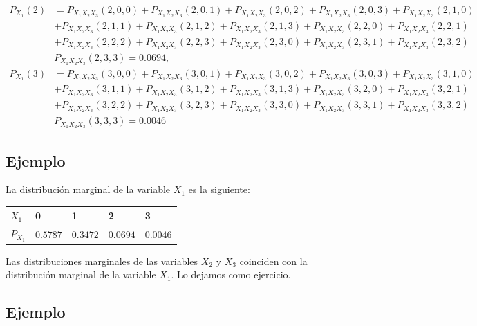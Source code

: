 \documentclass[]{book}
\begin{document}
\[
\begin{array}{rl}
P_{X_1}(2) & = P_{X_1X_2X_3}(2,0,0)+P_{X_1X_2X_3}(2,0,1)+P_{X_1X_2X_3}(2,0,2)+P_{X_1X_2X_3}(2,0,3)+P_{X_1X_2X_3}(2,1,0) \\ & +P_{X_1X_2X_3}(2,1,1)+P_{X_1X_2X_3}(2,1,2)+P_{X_1X_2X_3}(2,1,3)+P_{X_1X_2X_3}(2,2,0)+P_{X_1X_2X_3}(2,2,1)\\ &
+P_{X_1X_2X_3}(2,2,2)+P_{X_1X_2X_3}(2,2,3)+P_{X_1X_2X_3}(2,3,0)+P_{X_1X_2X_3}(2,3,1)+P_{X_1X_2X_3}(2,3,2)\\ &
P_{X_1X_2X_3}(2,3,3)=0.0694,\\
P_{X_1}(3) & = P_{X_1X_2X_3}(3,0,0)+P_{X_1X_2X_3}(3,0,1)+P_{X_1X_2X_3}(3,0,2)+P_{X_1X_2X_3}(3,0,3)+P_{X_1X_2X_3}(3,1,0) \\ & +P_{X_1X_2X_3}(3,1,1)+P_{X_1X_2X_3}(3,1,2)+P_{X_1X_2X_3}(3,1,3)+P_{X_1X_2X_3}(3,2,0)+P_{X_1X_2X_3}(3,2,1)\\ &
+P_{X_1X_2X_3}(3,2,2)+P_{X_1X_2X_3}(3,2,3)+P_{X_1X_2X_3}(3,3,0)+P_{X_1X_2X_3}(3,3,1)+P_{X_1X_2X_3}(3,3,2)\\ &
P_{X_1X_2X_3}(3,3,3)=0.0046
\end{array}
\]

\hypertarget{ejemplo-93}{%
\subsection{Ejemplo}\label{ejemplo-93}}

La distribución marginal de la variable \(X_1\) es la siguiente:

\begin{longtable}[]{@{}lllll@{}}
\toprule
\(X_1\) & 0 & 1 & 2 & 3\tabularnewline
\midrule
\endhead
\(P_{X_1}\) & \(0.5787\) & \(0.3472\) & \(0.0694\) & \(0.0046\)\tabularnewline
\bottomrule
\end{longtable}

Las distribuciones marginales de las variables \(X_2\) y \(X_3\) coinciden con la distribución marginal de la variable \(X_1\). Lo dejamos como ejercicio.

\hypertarget{ejemplo-94}{%
\subsection{Ejemplo}\label{ejemplo-94}}
\end{document}
